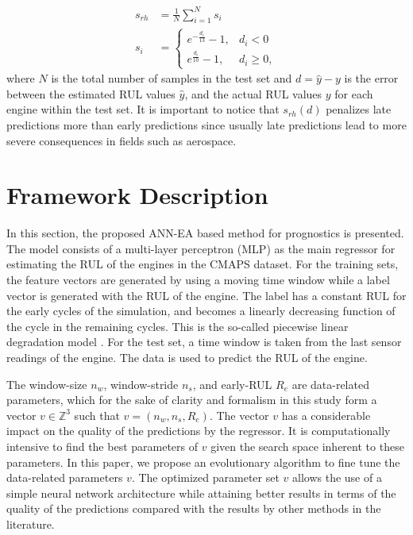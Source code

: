 \documentclass[12pt]{IEEEtran}%
\begin{document}
\begin{align}
s_{rh}  &  = \frac{1}{N} \sum_{i=1}^{N}{s_{i}}\nonumber\\
s_{i}  &  =
\begin{cases}
e^{-\frac{d_{i}}{13}} - 1, & d_{i} < 0\\
e^{\frac{d_{i}}{10}} - 1, & d_{i} \geq0,
\end{cases}
\label{eq:rhs}%
\end{align}
where $N$ is the total number of samples in the test set and $d = \hat{y} - y$
is the error between the estimated RUL values $\hat{y}$, and the actual RUL
values $y$ for each engine within the test set. It is important to notice that
$s_{rh}(d)$ penalizes late predictions more than early predictions since
usually late predictions lead to more severe consequences in fields such as aerospace.

\section{Framework Description}

\label{sec:method}

In this section, the proposed ANN-EA based method for prognostics is
presented. The model consists of a multi-layer perceptron (MLP) as the main
regressor for estimating the RUL of the engines in the CMAPS dataset. For the
training sets, the feature vectors are generated by using a moving time window
while a label vector is generated with the RUL of the engine. The label has a
constant RUL for the early cycles of the simulation, and becomes a linearly
decreasing function of the cycle in the remaining cycles. This is the
so-called piecewise linear degradation model \cite{Ramasso2014}. For the test
set, a time window is taken from the last sensor readings of the engine. The
data is used to predict the RUL of the engine.

The window-size $n_{w}$, window-stride $n_{s}$, and early-RUL $R_{e}$ are
data-related parameters, which for the sake of clarity and formalism in this
study form a vector $v \in\mathbb{Z}^{3}$ such that $v = (n_{w}, n_{s},
R_{e})$. The vector $v$ has a considerable impact on the quality of the
predictions by the regressor. It is computationally intensive to find the best
parameters of $v$ given the search space inherent to these parameters. In this
paper, we propose an evolutionary algorithm to fine tune the data-related
parameters $v$. The optimized parameter set $v$ allows the use of a simple
neural network architecture while attaining better results in terms of the
quality of the predictions compared with the results by other methods in the literature.
\end{document}
